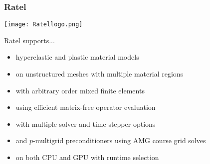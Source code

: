 \documentclass{beamer}
\begin{document}
\begin{frame}
\begin{center}
\frametitle{Ratel}

\begin{center}
\texttt{[image: Ratellogo.png]}
\end{center}

Ratel supports...

\begin{itemize}

\item hyperelastic and plastic material models

\item on unstructured meshes with multiple material regions

\item with arbitrary order mixed finite elements

\item using efficient matrix-free operator evaluation

\item with multiple solver and time-stepper options

\item and $p$-multigrid preconditioners using AMG course grid solves

\item on both CPU and GPU with runtime selection

\end{itemize}

\end{center}
\end{frame}

\end{document}
